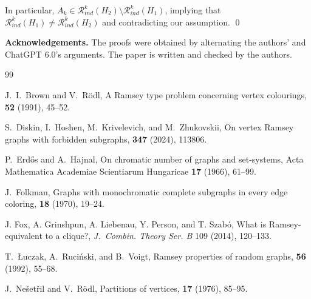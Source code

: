 \documentclass[10pt,a4paper]{article}
\theoremstyle{plain}
\theoremstyle{definition}
\newcommand{\R}{\mathcal{R}}
\newcommand{\Rk}{\R_{ind}}
\begin{document}
In particular, $A_{k}\in \R_{ind}^{k}(H_2) \setminus \R_{ind}^{k}(H_1)$, implying that  $\Rk^k(H_1)\neq \Rk^k(H_2)$ and  contradicting our assumption.
\qed




    \textbf{Acknowledgements.}  The proofs were obtained by alternating the authors' and ChatGPT 6.0's arguments.  The paper is written and checked by the authors.
 {\hypersetup{linkcolor=cred}
 \newcommand{\etalchar}[1]{$^{#1}$}
 
 
 
 \begin{thebibliography}{99}
 
J.~I.~Brown and V.~R\"odl,
\newblock A Ramsey type problem concerning vertex colourings,
 {\bf 52} (1991), 45--52.


S.~Diskin, I.~Hoshen, M.~Krivelevich, and M.~Zhukovskii,
\newblock On vertex Ramsey graphs with forbidden subgraphs,
 {\bf 347} (2024), 113806.


P.~Erd\H{o}s and A.~Hajnal,
On chromatic number of graphs and set-systems,
Acta Mathematica Academiae Scientiarum Hungaricae
\textbf{17} (1966), 61--99.

J.~Folkman,
\newblock Graphs with monochromatic complete subgraphs in every edge coloring,
 {\bf 18} (1970), 19--24.

  J. Fox, A. Grinshpun, A. Liebenau, Y. Person,  and T. Szab\'o, What is Ramsey-equivalent to a clique?, {\em J.~Combin. Theory Ser. B} 109 (2014), 120--133.

T.~\L uczak, A.~Ruci\'nski, and B.~Voigt,
\newblock Ramsey properties of random graphs,
 {\bf 56} (1992), 55--68.

J.~Ne\v{s}et\v{r}il and V.~R\"odl,
\newblock Partitions of vertices,
 {\bf 17} (1976), 85--95.

\end{thebibliography}
}
\end{document}
